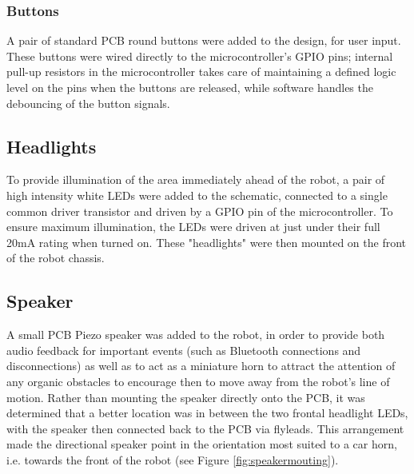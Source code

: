 \FloatBarrier
\subsubsection{Buttons}

A pair of standard PCB round buttons were added to the design, for user input. These buttons were wired directly to the microcontroller's GPIO pins; internal pull-up resistors in the microcontroller takes care of maintaining a defined logic level on the pins when the buttons are released, while software handles the debouncing of the button signals.

\FloatBarrier
\subsection{Headlights}

To provide illumination of the area immediately ahead of the robot, a pair of high intensity white LEDs were added to the schematic, connected to a single common driver transistor and driven by a GPIO pin of the microcontroller. To ensure maximum illumination, the LEDs were driven at just under their full 20mA rating when turned on. These "headlights" were then mounted on the front of the robot chassis.

\FloatBarrier
\subsection{Speaker}

A small PCB Piezo speaker was added to the robot, in order to provide both audio feedback for important events (such as Bluetooth connections and disconnections) as well as to act as a miniature horn to attract the attention of any organic obstacles to encourage then to move away from the robot's line of motion. Rather than mounting the speaker directly onto the PCB, it was determined that a better location was in between the two frontal headlight LEDs, with the speaker then connected back to the PCB via flyleads. This arrangement made the directional speaker point in the orientation most suited to a car horn, i.e. towards the front of the robot (see Figure \ref{fig:speakermouting}).

